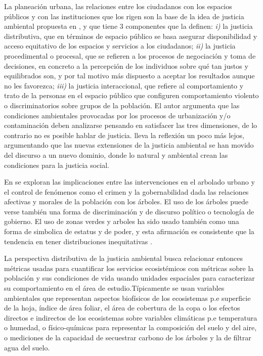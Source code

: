 \documentclass[12pt,]{book}
\begin{document}
La planeación urbana, las relaciones entre los ciudadanos con los
espacios públicos y con las instituciones que los rigen son la base de
la idea de justicia ambiental propuesta en \citep{low_public_2013}, y
que tiene 3 componentes que la definen: \emph{i)} la justicia
distributiva, que en términos de espacio público se basa asegurar
disponibilidad y acceso equitativo de los espacios y servicios a los
ciudadanos; \emph{ii)} la justicia procedimental o procesal, que se
refieren a los procesos de negociación y toma de decisiones, en concreto
a la percepción de los individuos sobre qué tan justos y equilibrados
son, y por tal motivo más dispuesto a aceptar los resultados aunque no
les favorezca; \emph{iii)} la justicia interaccional, que refiere al
comportamiento y trato de la personas en el espacio público que
configuren comportamiento violento o discriminatorios sobre grupos de la
población. El autor argumenta que las condiciones ambientales provocadas
por los procesos de urbanización y/o contaminación deben analizarse
pensando en satisfacer las tres dimensiones, de lo contrario no es
posible hablar de justicia. \citep{schlosberg_theorising_2013} lleva la
reflexión un poco más lejos, argumentando que las nuevas extensiones de
la justicia ambiental se han movido del discurso a un nuevo dominio,
donde lo natural y ambiental crean las condiciones para la justicia
social.

En \citep{braverman_everybody_2008} se exploran las implicaciones entre
las intervenciones en el arbolado urbano y el control de fenómenos como
el crimen y la gobernabilidad dada las relaciones afectivas y morales de
la población con los árboles. El uso de los árboles puede verse también
una forma de discriminación y de discurso político o tecnología de
gobierno. El uso de zonas verdes y arboles ha sido usado también como
una forma de simbolica de estatus y de poder, y esta afirmación es
consistente que la tendencia en tener distribuciones inequitativas
\citep{braverman_everybody_2008}.

La perspectiva distributiva de la justicia ambiental busca relacionar
entonces métricas usadas para cuantificar los servicios ecosistémicos
con métricas sobre la población y sus condiciones de vida usando
unidades espaciales para caracterizar su comportamiento en el área de
estudio.Típicamente se usan variables ambientales que representan
aspectos biofísicos de los ecosistemas p.e superficie de la hoja, índice
de área foliar, el área de cobertura de la copa o los efectos directos e
indirectos de los ecosistemas sobre variables climáticas p.e temperatura
o humedad, o físico-químicas para representar la composición del suelo y
del aire, o mediciones de la capacidad de secuestrar carbono de los
árboles y la de filtrar agua del suelo.
\end{document}
